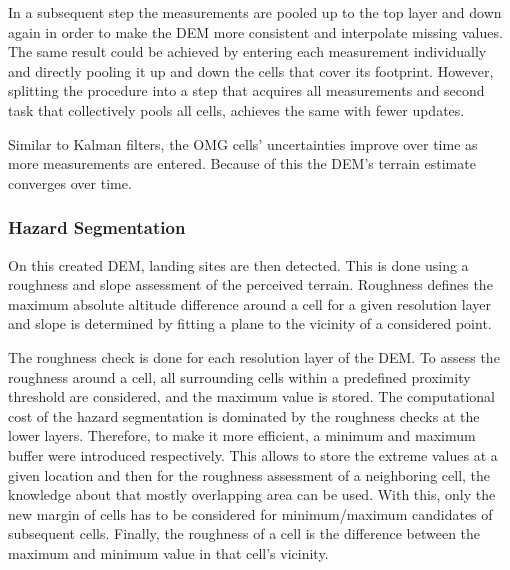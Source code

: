 In a subsequent step the measurements are pooled up to the top layer and down again in order to make the DEM more consistent and interpolate missing values. The same result could be achieved by entering each measurement individually and directly pooling it up and down the cells that cover its footprint. However, splitting the procedure into a step that acquires all measurements and second task that collectively pools all cells, achieves the same with fewer updates.

Similar to Kalman filters, the OMG cells' uncertainties improve over time as more measurements are entered. Because of this the DEM's terrain estimate converges over time. 


\subsubsection{Hazard Segmentation}\label{subsubsec:setup:haz_seg}

On this created DEM, landing sites are then detected. This is done using a roughness and slope assessment of the perceived terrain. Roughness defines the maximum absolute altitude difference around a cell for a given resolution layer and slope is determined by fitting a plane to the vicinity of a considered point.

The roughness check is done for each resolution layer of the DEM. To assess the roughness around a cell, all surrounding cells within a predefined proximity threshold are considered, and the maximum value is stored. The computational cost of the hazard segmentation is dominated by the roughness checks at the lower layers. Therefore, to make it more efficient, a minimum and maximum buffer were introduced respectively. This allows to store the extreme values at a given location and then for the roughness assessment of a neighboring cell, the knowledge about that mostly overlapping area can be used. With this, only the new margin of cells has to be considered for minimum/maximum candidates of subsequent cells. Finally, the roughness of a cell is the difference between the maximum and minimum value in that cell's vicinity.

